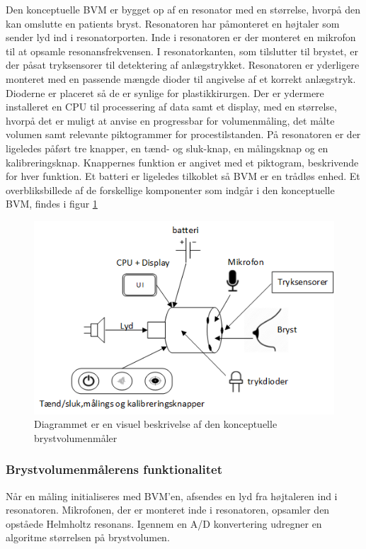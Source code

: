 	Den konceptuelle BVM er bygget op af en resonator med en størrelse, hvorpå den kan omslutte en patients bryst. Resonatoren har påmonteret en højtaler som sender lyd ind i resonatorporten. Inde i resonatoren er der monteret en mikrofon til at opsamle resonansfrekvensen. I resonatorkanten, som tilslutter til brystet, er der påsat tryksensorer til detektering af anlægstrykket. Resonatoren er yderligere monteret med en passende mængde dioder til angivelse af et korrekt anlægstryk. Dioderne er placeret så de er synlige for plastikkirurgen. Der er ydermere installeret en CPU til processering af data samt et display, med en størrelse, hvorpå det er muligt at anvise en progressbar for volumenmåling, det målte volumen samt relevante piktogrammer for procestilstanden. På resonatoren er der ligeledes påført tre knapper, en tænd- og sluk-knap, en målingsknap og en kalibreringsknap. Knappernes funktion er angivet med et piktogram, beskrivende for hver funktion. Et batteri er ligeledes tilkoblet så BVM er en trådløs enhed. Et overbliksbillede af de forskellige komponenter som indgår i den konceptuelle BVM, findes i figur \ref{fig:ksys} 
		
\vspace{5mm}  
		
		\begin{figure}[htb]
			\centering
				\includegraphics[width=5in]{Ksys.png}
				\caption{Diagrammet er en visuel beskrivelse af den konceptuelle brystvolumenmåler}	
				\label{fig:ksys}
			\end{figure}	     
		
	
		\subsubsection{Brystvolumenmålerens funktionalitet}
		Når en måling initialiseres med BVM'en, afsendes en lyd fra højtaleren ind i resonatoren. Mikrofonen, der er monteret inde i resonatoren, opsamler den opståede Helmholtz resonans. Igennem en A/D konvertering udregner en algoritme størrelsen på brystvolumen. 
	
